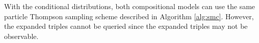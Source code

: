With the conditional distributions, both compositional models can use the same
particle Thompson sampling scheme described in Algorithm \ref{alg:smc}.
However, the expanded triples cannot be queried since the expanded triples 
may not be observable.

